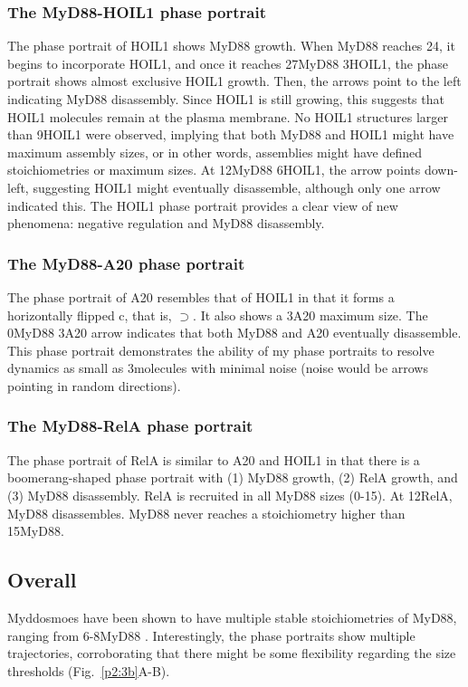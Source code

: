 \subsubsection{The MyD88-HOIL1 phase portrait}
The phase portrait of HOIL1 shows MyD88 growth. When MyD88 reaches 24\times, it begins to incorporate HOIL1, and once it reaches 27\times MyD88 3\times HOIL1, the phase portrait shows almost exclusive HOIL1 growth. Then, the arrows point to the left indicating MyD88 disassembly. Since HOIL1 is still growing, this suggests that HOIL1 molecules remain at the plasma membrane. No HOIL1 structures larger than 9\times HOIL1 were observed, implying that both MyD88 and HOIL1 might have maximum assembly sizes, or in other words, assemblies might have defined stoichiometries or maximum sizes. At 12\times MyD88 6\times HOIL1, the arrow points down-left, suggesting HOIL1 might eventually disassemble, although only one arrow indicated this. The HOIL1 phase portrait provides a clear view of new phenomena: negative regulation and MyD88 disassembly.

\subsubsection{The MyD88-A20 phase portrait}
The phase portrait of A20 resembles that of HOIL1 in that it forms a horizontally flipped c, that is, $\supset$. It also shows a 3\times A20 maximum size. The 0\times MyD88 3\times A20 arrow indicates that both MyD88 and A20 eventually disassemble. This phase portrait demonstrates the ability of my phase portraits to resolve dynamics as small as 3\times molecules with minimal noise (noise would be arrows pointing in random directions).

\subsubsection{The MyD88-RelA phase portrait}
The phase portrait of RelA is similar to A20 and HOIL1 in that there is a boomerang-shaped phase portrait with (1) MyD88 growth, (2) RelA growth, and (3) MyD88 disassembly. RelA is recruited in all MyD88 sizes (0-15\times). At 12\times RelA, MyD88 disassembles. MyD88 never reaches a stoichiometry higher than 15\times MyD88.

\subsection{Overall}
Myddosmoes have been shown to have multiple stable stoichiometries of MyD88, ranging from 6-8\times MyD88 \autocite{Moncrieffe_2020}. Interestingly, the phase portraits show multiple trajectories, corroborating that there might be some flexibility regarding the size thresholds (Fig.~\ref{p2:3b}A-B).

